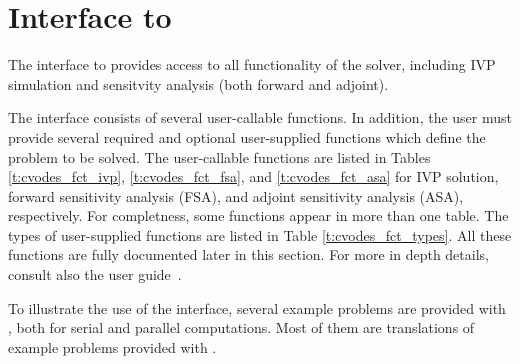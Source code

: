 \newpage
\section{{\matlab} Interface to {\cvodes}}

The {\matlab} interface to {\cvodes} provides access to all functionality of the 
{\cvodes} solver, including IVP simulation and sensitvity analysis (both forward 
and adjoint).

The interface consists of several user-callable functions. In addition, the user must provide
several required and optional user-supplied functions which define the problem to be solved.
The user-callable functions are listed in Tables \ref{t:cvodes_fct_ivp}, \ref{t:cvodes_fct_fsa},
and \ref{t:cvodes_fct_asa} for IVP solution, forward sensitivity analysis (FSA), and  adjoint 
sensitivity analysis (ASA), respectively.
For completness, some functions appear in more than one table. 
The types of user-supplied functions are listed in Table \ref{t:cvodes_fct_types}.
%
All these functions are fully documented later in this section. 
For more in depth details, consult also the {\cvodes} user guide~\cite{cvodes_ug}.

To illustrate the use of the {\cvodes} {\matlab} interface, several example problems are provided
with {\sundialsTB}, both for serial and parallel computations. Most of them are {\matlab} translations of example
problems provided with {\cvodes}.


